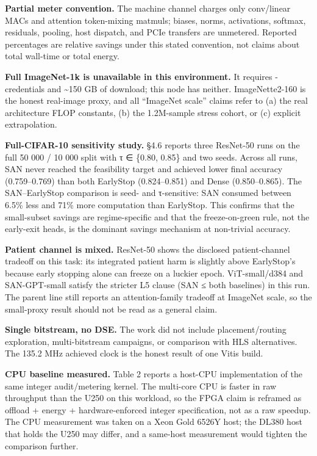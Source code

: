 \documentclass[
]{article}
\begin{document}
\textbf{Partial meter convention.} The machine channel charges only
conv/linear MACs and attention token-mixing matmuls; biases, norms,
activations, softmax, residuals, pooling, host dispatch, and PCIe
transfers are unmetered. Reported percentages are relative savings under
this stated convention, not claims about total wall-time or total
energy.

\textbf{Full ImageNet-1k is unavailable in this environment.} It
requires -credentials and \textasciitilde150 GB of download; this node
has neither. ImageNette2-160 is the honest real-image proxy, and all
``ImageNet scale'' claims refer to (a) the real architecture FLOP
constants, (b) the 1.2M-sample stress cohort, or (c) explicit
extrapolation.

\textbf{Full-CIFAR-10 sensitivity study.} §4.6 reports three ResNet-50
runs on the full 50 000 / 10 000 split with τ ∈ \{0.80, 0.85\} and two
seeds. Across all runs, SAN never reached the feasibility target and
achieved lower final accuracy (0.759--0.769) than both EarlyStop
(0.824--0.851) and Dense (0.850--0.865). The SAN--EarlyStop comparison
is seed- and τ-sensitive: SAN consumed between 6.5\% less and 71\% more
computation than EarlyStop. This confirms that the small-subset savings
are regime-specific and that the freeze-on-green rule, not the
early-exit heads, is the dominant savings mechanism at non-trivial
accuracy.

\textbf{Patient channel is mixed.} ResNet-50 shows the disclosed
patient-channel tradeoff on this task: its integrated patient harm is
slightly above EarlyStop's because early stopping alone can freeze on a
luckier epoch. ViT-small/d384 and SAN-GPT-small satisfy the stricter L5
clause (SAN ≤ both baselines) in this run. The parent line still reports
an attention-family tradeoff at ImageNet scale, so the small-proxy
result should not be read as a general claim.

\textbf{Single bitstream, no DSE.} The work did not include
placement/routing exploration, multi-bitstream campaigns, or comparison
with HLS alternatives. The 135.2 MHz achieved clock is the honest result
of one Vitis build.

\textbf{CPU baseline measured.} Table 2 reports a host-CPU
implementation of the same integer audit/metering kernel. The multi-core
CPU is faster in raw throughput than the U250 on this workload, so the
FPGA claim is reframed as offload + energy + hardware-enforced integer
specification, not as a raw speedup. The CPU measurement was taken on a
Xeon Gold 6526Y host; the DL380 host that holds the U250 may differ, and
a same-host measurement would tighten the comparison further.
\end{document}

